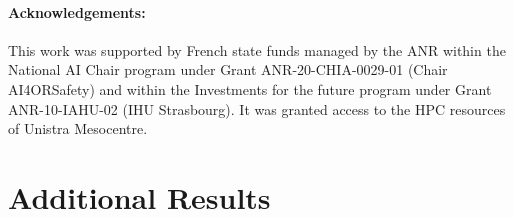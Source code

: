 \documentclass{article}
\begin{document}
\paragraph{Acknowledgements:}
This work was supported by French state funds managed by the ANR within the National AI Chair program under Grant ANR-20-CHIA-0029-01 (Chair AI4ORSafety) and within the Investments for the future program under Grant ANR-10-IAHU-02 (IHU Strasbourg). It was granted access to the HPC resources of Unistra Mesocentre.




\newpage
\renewcommand{\thesubsection}{\Alph{subsection}}

\section*{Additional Results}\label{extra_results}
\begin{table}[ht]
\centering
    \setlength{\tabcolsep}{18pt}
\caption{\label{tam_ivtcomp}Results AP (\%) on triplet recognition when TAM is added to other triplet components. TAM performs well when added only to the verb component. The verb performance is lowest when TAM is added on verb and target.
}
\end{table}
\end{document}
